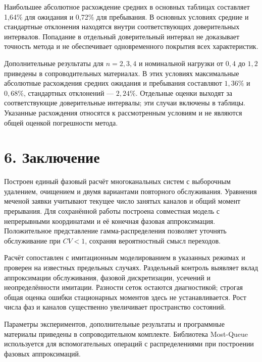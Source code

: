 Наибольшее абсолютное расхождение средних в основных таблицах составляет 1,64\% для ожидания и 0,72\% для пребывания. В основных условиях средние и стандартные отклонения находятся внутри соответствующих доверительных интервалов. Попадание в отдельный доверительный интервал не доказывает точность метода и не обеспечивает одновременного покрытия всех характеристик.

Дополнительные результаты для \(n=2,3,4\) и номинальной нагрузки от \(0{,}4\) до \(1{,}2\) приведены в сопроводительных материалах. В этих условиях максимальные абсолютные расхождения средних ожидания и пребывания составляют \(1{,}36\%\) и \(0{,}68\%\), стандартных отклонений --- \(2{,}24\%\). Отдельные оценки выходят за соответствующие доверительные интервалы; эти случаи включены в таблицы. Указанные расхождения относятся к рассмотренным условиям и не являются общей оценкой погрешности метода.

\section*{6. Заключение}
Построен единый фазовый расчёт многоканальных систем с выборочным удалением, очищением и двумя вариантами повторного обслуживания. Уравнения меченой заявки учитывают текущее число занятых каналов и общий момент прерывания. Для сохранённой работы построена совместная модель с непрерывными координатами и её конечная фазовая аппроксимация. Положительное представление гамма-распределения позволяет уточнять обслуживание при \(CV<1\), сохраняя вероятностный смысл переходов.

Расчёт сопоставлен с имитационным моделированием в указанных режимах и проверен на известных предельных случаях. Раздельный контроль выявляет вклад аппроксимации обслуживания, фазовой дискретизации, усечений и неопределённости имитации. Разности сеток остаются диагностикой; строгая общая оценка ошибки стационарных моментов здесь не устанавливается. Рост числа фаз и каналов существенно увеличивает пространство состояний.

Параметры экспериментов, дополнительные результаты и программные материалы приведены в сопроводительном комплекте. Библиотека Most-Queue \cite{mostqueue2026} используется для вспомогательных операций с распределениями при построении фазовых аппроксимаций.


